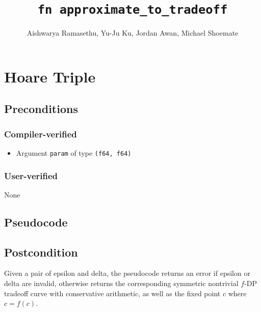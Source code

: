 \documentclass{article}
\title{\texttt{fn approximate\_to\_tradeoff}}
\author{Aishwarya Ramasethu, Yu-Ju Ku, Jordan Awan, Michael Shoemate}
\begin{document}
\maketitle

\contrib

\section{Hoare Triple}

\subsection*{Preconditions}
\subsubsection*{Compiler-verified}
\begin{itemize}
    \item Argument \texttt{param} of type \texttt{(f64, f64)}
\end{itemize}

\subsubsection*{User-verified}
None

\subsection*{Pseudocode}



\subsection*{Postcondition}

\begin{theorem}
    Given a pair of epsilon and delta, the pseudocode returns an error if epsilon or delta are invalid,
    otherwise returns the corresponding symmetric nontrivial $f$-DP tradeoff curve
    with conservative arithmetic, 
    as well as the fixed point $c$ where $c = f(c)$.
\end{theorem}
\end{document}
